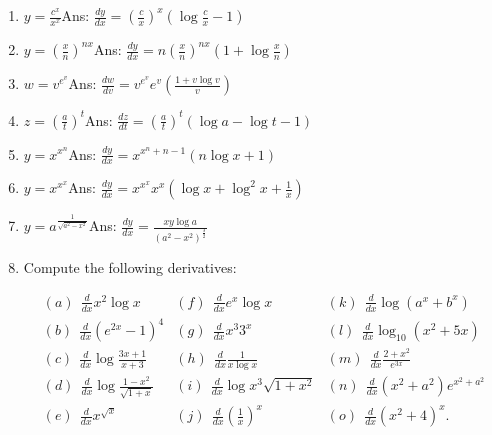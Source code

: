 \begin{enumerate}
\item
$y = \frac{c^x}{x^x}$\qquad\qquad\qquad\qquad\qquad\qquad Ans: 	
$\frac{dy}{dx} = \left ( \frac{c}{x} \right )^x \left ( \log \frac{c}{x} - 1 \right )$

\item
$y = \left ( \frac{x}{n} \right )^{nx}$\qquad\qquad\qquad\qquad\qquad\qquad Ans: 	
$\frac{dy}{dx} = n \left ( \frac{x}{n} \right )^{nx} \left ( 1 + \log \frac{x}{n} \right )$

\item
$w = v^{e^v}$\qquad\qquad\qquad\qquad\qquad\qquad Ans: 	
$\frac{dw}{dv} = v^{e^v} e^v \left ( \frac{1 + v \log v}{v} \right )$

\item
$z = \left ( \frac{a}{t} \right )^t$\qquad\qquad\qquad\qquad\qquad\qquad Ans: 	$\frac{dz}{dt} 
= \left ( \frac{a}{t} \right )^t (\log a - \log t - 1)$

\item
$y = x^{x^n}$\qquad\qquad\qquad\qquad\qquad\qquad Ans: 	$\frac{dy}{dx} = x^{x^n + n - 1}(n \log x + 1)$

\item
$y = x^{x^x}$\qquad\qquad\qquad\qquad\qquad\qquad Ans: 	$\frac{dy}{dx} = x^{x^x} x^x \left ( \log x + \log^2 x + \frac{1}{x} \right )$

\item
$y = a^{\frac{1}{\sqrt{a^2 - x^2}}}$\qquad\qquad\qquad\qquad\qquad\qquad Ans: 	$\frac{dy}{dx} = \frac{xy \log a}{(a^2 - x^2)^{\frac{3}{2}}}$

\item
Compute the following derivatives: %

\[
\begin{array}{lll}
(a)\ \  \frac{d}{dx} x^2 \log x &  	(f)\ \  \frac{d}{dx} e^x \log x &  	(k)\ \  \frac{d}{dx} \log (a^x + b^x) \\
(b)\ \  \frac{d}{dx} (e^{2x} - 1)^4 &  	(g)\ \  \frac{d}{dx} x^3 3^x &	(l)\ \  \frac{d}{dx} \log_10 (x^2 + 5x)\\
(c)\ \  \frac{d}{dx} \log \frac{3x + 1}{x + 3} &  	(h)\ \  \frac{d}{dx} \frac{1}{x \log x} &  	(m)\ \  \frac{d}{dx} \frac{2 + x^2}{e^{3x}}\\
(d)\ \  \frac{d}{dx} \log \frac{1 - x^2}{\sqrt{1 + x}} &  	(i)\ \  \frac{d}{dx} \log x^3 \sqrt{1 + x^2} &  	(n)\ \  \frac{d}{dx} (x^2 + a^2) e^{x^2 + a^2}\\
(e)\ \  \frac{d}{dx} x^{\sqrt{x}} &  	(j)\ \  \frac{d}{dx} \left ( \frac{1}{x} \right )^x &  	(o)\ \  \frac{d}{dx} (x^2 + 4)^x.
\end{array}
\]


\end{enumerate}
